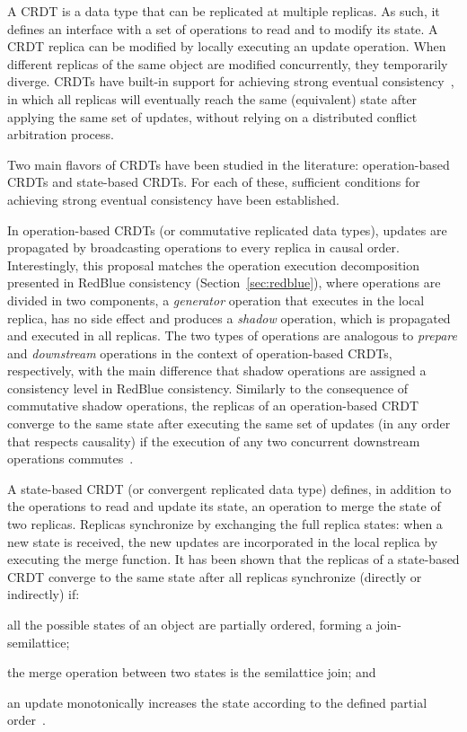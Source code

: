 \documentclass[11pt]{article}
\begin{document}
A CRDT is a data type that can be replicated at multiple replicas. As such,
it defines an interface with a set of operations to read and to modify its state.
A CRDT replica can be modified by locally executing an update operation.
When different replicas of the same object are modified concurrently, they
temporarily diverge.
CRDTs have built-in support for achieving strong eventual consistency~\cite{crdts}, in which
all replicas will eventually reach the same (equivalent) state after applying
the same set of updates, without relying on a distributed conflict arbitration
process.

Two main flavors of CRDTs have been studied in the literature: operation-based CRDTs
and state-based CRDTs. For each of these, sufficient conditions for
achieving strong eventual consistency have been established.

In operation-based CRDTs (or commutative replicated data types), updates
are propagated by broadcasting operations to every replica in causal order.
Interestingly, this proposal matches the operation execution decomposition presented
in RedBlue consistency (Section~\ref{sec:redblue}), where operations are divided in two components, a {\em generator}
operation that executes in the local replica, has no side effect and produces a
{\em shadow} operation, which is propagated and executed in all replicas.
The two types of operations are analogous to {\em prepare} and {\em downstream} operations
in the context of  operation-based CRDTs, respectively, with the main difference that shadow operations are assigned a consistency level in RedBlue consistency.
Similarly to the consequence of commutative shadow operations, the replicas of an operation-based CRDT converge to the same state after executing the same set of updates (in any order that respects causality)
if the execution of any two concurrent downstream operations commutes~\cite{crdts}.

A state-based CRDT (or convergent replicated data type) defines, in addition to
the operations to read and update its state, an operation to merge the
state of two replicas.
Replicas synchronize by exchanging the full replica states: when a new
state is received, the new updates are incorporated in the local replica
by executing the merge function.
It has been shown that the replicas of a state-based CRDT converge to the same state
after all replicas synchronize (directly or indirectly) if:
\begin{inparaenum}[(1)]
\item all the possible states of an object are partially ordered, forming a
join-semilattice;
\item the merge operation between two states is the semilattice join; and
\item an update monotonically increases the state according to the defined
partial order~\cite{crdts}.
\end{inparaenum}
\end{document}
